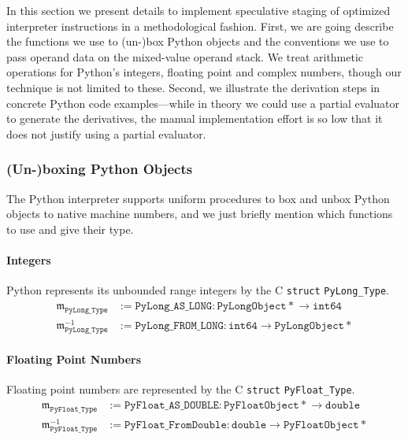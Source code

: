\documentclass[preprint,10pt]{popl14conf}
\newcommand{\pyType}[1]{\texttt{Py#1\_Type}}
\begin{document}
In this section we present details to implement speculative staging of optimized interpreter
instructions in a methodological fashion.
First, we are going describe the functions we use to (un-)box Python objects and the conventions we
use to pass operand data on the mixed-value operand stack.
We treat arithmetic operations for Python's integers, floating point and complex numbers, though our
technique is not limited to these.
Second, we illustrate the derivation steps in concrete Python code examples---while in theory we
could use a partial evaluator to generate the derivatives, the manual implementation effort is so
low that it does not justify using a partial evaluator.


\subsubsection{(Un-)boxing Python Objects}

The Python interpreter supports uniform procedures to box and unbox Python objects to native machine
numbers, and we just briefly mention which functions to use and give their type.

\paragraph{Integers}
Python represents its unbounded range integers by the C \texttt{struct} \pyType{Long}.
\begin{align*}
  \mathfrak{m}_{\mathtt{PyLong\_Type}} & := \mathtt{PyLong\_AS\_LONG} : \mathtt{PyLongObject*} \rightarrow \mathtt{int64} \\
  \mathfrak{m}_{\mathtt{PyLong\_Type}}^{-1} & := \mathtt{PyLong\_FROM\_LONG} :  \mathtt{int64} \rightarrow \mathtt{PyLongObject*}
\end{align*}


\paragraph{Floating Point Numbers}
Floating point numbers are represented by the C \texttt{struct} \pyType{Float}.
\begin{align*}
  \mathfrak{m}_{\mathtt{PyFloat\_Type}} & := \mathtt{PyFloat\_AS\_DOUBLE} : \mathtt{PyFloatObject*} \rightarrow \mathtt{double} \\
  \mathfrak{m}_{\mathtt{PyFloat\_Type}}^{-1} & := \mathtt{PyFloat\_FromDouble} :  \mathtt{double} \rightarrow \mathtt{PyFloatObject*}
\end{align*}
\end{document}
